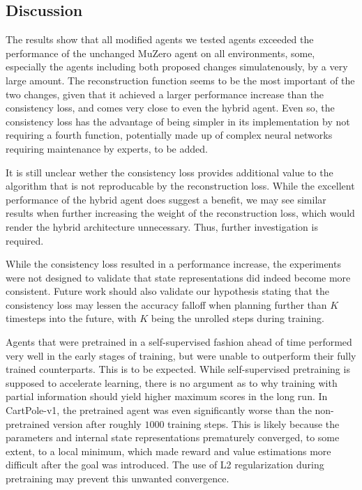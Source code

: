 \subsection{Discussion}
The results show that all modified agents we tested agents exceeded the performance of the unchanged MuZero agent on all environments, some, especially the agents including both proposed changes simulatenously, by a very large amount. The reconstruction function seems to be the most important of the two changes, given that it achieved a larger performance increase than the consistency loss, and comes very close to even the hybrid agent. Even so, the consistency loss has the advantage of being simpler in its implementation by not requiring a fourth function, potentially made up of complex neural networks requiring maintenance by experts, to be added.

It is still unclear wether the consistency loss provides additional value to the algorithm that is not reproducable by the reconstruction loss. While the excellent performance of the hybrid agent does suggest a benefit, we may see similar results when further increasing the weight of the reconstruction loss, which would render the hybrid architecture unnecessary. Thus, further investigation is required.

While the consistency loss resulted in a performance increase, the experiments were not designed to validate that state representations did indeed become more consistent. Future work should also validate our hypothesis stating that the consistency loss may lessen the accuracy falloff when planning further than $K$ timesteps into the future, with $K$ being the unrolled steps during training.

Agents that were pretrained in a self-supervised fashion ahead of time performed very well in the early stages of training, but were unable to outperform their fully trained counterparts. This is to be expected. While self-supervised pretraining is supposed to accelerate learning, there is no argument as to why training with partial information should yield higher maximum scores in the long run. In CartPole-v1, the pretrained agent was even significantly worse than the non-pretrained version after roughly $1000$ training steps. This is likely because the parameters and internal state representations prematurely converged, to some extent, to a local minimum, which made reward and value estimations more difficult after the goal was introduced. The use of L2 regularization during pretraining may prevent this unwanted convergence.